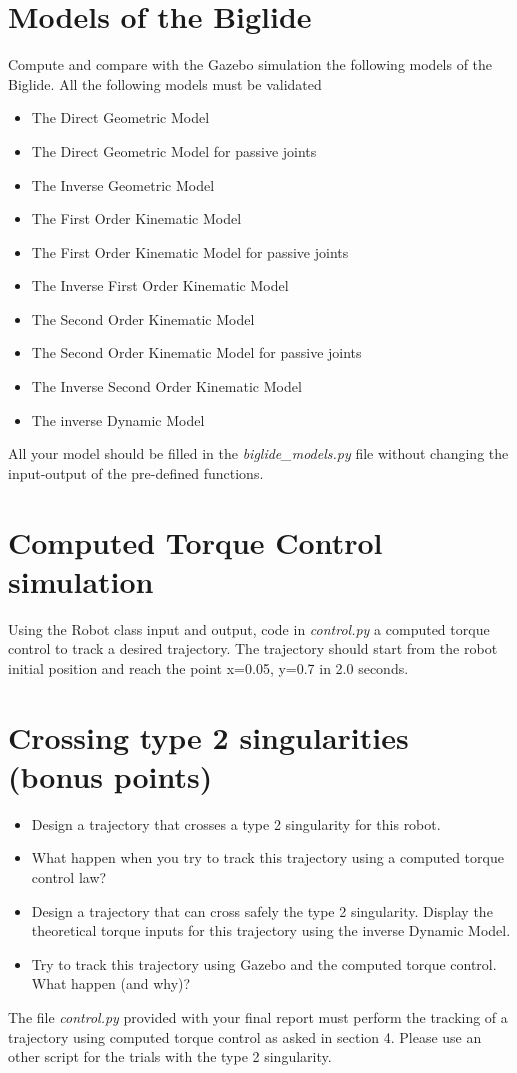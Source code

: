 \documentclass[a4paper]{article}
\begin{document}
\section{Models of the Biglide}
\label{analysis}
Compute and compare with the Gazebo simulation the following models of the Biglide.
%
All the following models must be validated
\begin{itemize}
    \item The Direct Geometric Model
    \item The Direct Geometric Model for passive joints
    \item The Inverse Geometric Model
    \item The First Order Kinematic Model
    \item The First Order Kinematic Model for passive joints
    \item The Inverse First Order Kinematic Model
    \item The Second Order Kinematic Model
    \item The Second Order Kinematic Model for passive joints
    \item The Inverse Second Order Kinematic Model
    \item The inverse Dynamic Model
\end{itemize}
%
All your model should be filled in the \textit{biglide\_models.py} file without changing the input-output of the pre-defined functions.
%
\section{Computed Torque Control simulation}

Using the Robot class input and output, code in \textit{control.py} a computed torque control to track a desired trajectory. The trajectory should start from the robot initial position and reach the point x=0.05, y=0.7 in 2.0 seconds.
    
\section{Crossing type 2 singularities (bonus points)}
\begin{itemize}
    \item Design a trajectory that crosses a type 2 singularity for this robot.
    \item What happen when you try to track this trajectory using a computed torque control law?
    \item Design a trajectory that can cross safely the type 2 singularity. Display the theoretical torque inputs for this trajectory using the inverse Dynamic Model.
    \item Try to track this trajectory using Gazebo and the computed torque control. What happen (and why)?
\end{itemize}
%
The file \textit{control.py} provided with your final report must perform the tracking of a trajectory using computed torque control as asked in section 4. Please use an other script for the trials with the type 2 singularity.
%
\end{document}
